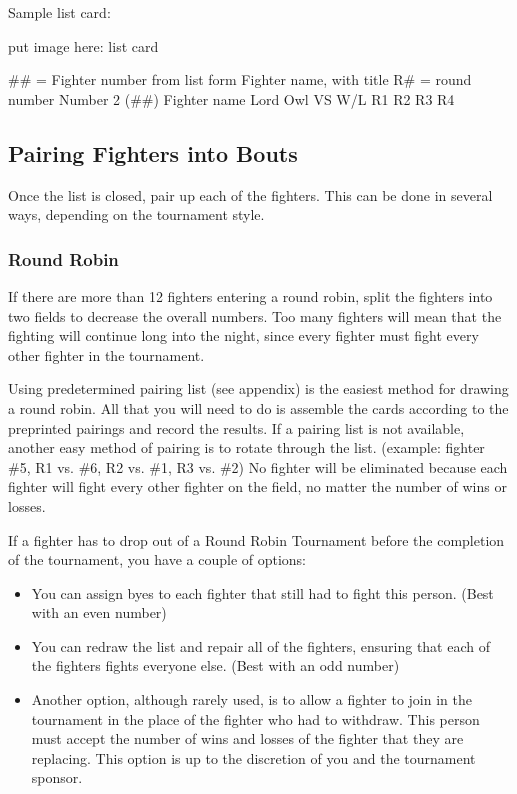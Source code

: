 \documentclass{article}
\begin{document}
Sample list card:

put image here: list card

\#\# = Fighter number from list form
Fighter name, with title
R\# = round number
Number 2 (\#\#)
Fighter name
Lord Owl
VS W/L
R1
R2
R3
R4


\subsection{Pairing Fighters into Bouts}
Once the list is closed, pair up each of the fighters. This can be done in several ways, depending on the
tournament style.

\subsubsection*{Round Robin}

If there are more than 12 fighters entering a round robin, split the fighters into two fields to decrease the
overall numbers. Too many fighters will mean that the fighting will continue long into the night, since
every fighter must fight every other fighter in the tournament.

Using predetermined pairing list (see appendix) is the easiest method for drawing a round robin. All that
you will need to do is assemble the cards according to the preprinted pairings and record the results. If a
pairing list is not available, another easy method of pairing is to rotate through the list. (example: fighter
\#5, R1 vs. \#6, R2 vs. \#1, R3 vs. \#2) No fighter will be eliminated because each fighter will fight every
other fighter on the field, no matter the number of wins or losses.

If a fighter has to drop out of a Round Robin Tournament before the completion of the tournament, you
have a couple of options:
\begin{itemize}
\item You can assign byes to each fighter that still had to fight this person. (Best with an even number)

\item You can redraw the list and repair all of the fighters, ensuring that each of the fighters fights everyone
else. (Best with an odd number)

\item Another option, although rarely used, is to allow a fighter to join in the tournament in the place of the
fighter who had to withdraw. This person must accept the number of wins and losses of the fighter that
they are replacing. This option is up to the discretion of you and the tournament sponsor.
\end{itemize}
\end{document}
